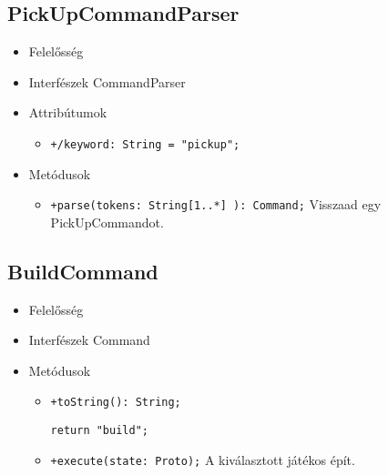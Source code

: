 \subsection{PickUpCommandParser}
\begin{itemize}
\item Felelősség\newline
\item Interfészek\newline
CommandParser
\item Attribútumok
	\begin{itemize}
		\item \texttt{+/keyword: String = "pickup";}
	\end{itemize}
\item Metódusok
\begin{itemize}
		\item \texttt{+parse(tokens: String[1..*] ): Command;} \newline
		Visszaad egy PickUpCommandot.
	\end{itemize}
\end{itemize}

\subsection{BuildCommand}
\begin{itemize}
\item Felelősség\newline
\item Interfészek\newline
Command
\item Metódusok
\begin{itemize}
		\item \texttt{+toString(): String;}
		\begin{lstlisting}
return "build";
		\end{lstlisting}
		\item \texttt{+execute(state: Proto);} \newline
		A kiválasztott játékos épít.
	\end{itemize}
\end{itemize}
